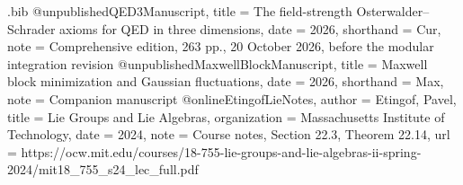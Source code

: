 \begin{filecontents*}[overwrite]{\jobname.bib}
@unpublished{QED3Manuscript,
  title = {The field-strength {Osterwalder--Schrader} axioms for {QED} in three dimensions},
  date = {2026},
  shorthand = {Cur},
  note = {Comprehensive edition, 263 pp., 20 October 2026, before the modular integration revision}
}
@unpublished{MaxwellBlockManuscript,
  title = {Maxwell block minimization and {Gaussian} fluctuations},
  date = {2026},
  shorthand = {Max},
  note = {Companion manuscript}
}
@online{EtingofLieNotes,
  author = {Etingof, Pavel},
  title = {Lie Groups and Lie Algebras},
  organization = {Massachusetts Institute of Technology},
  date = {2024},
  note = {Course notes, Section 22.3, Theorem 22.14},
  url = {https://ocw.mit.edu/courses/18-755-lie-groups-and-lie-algebras-ii-spring-2024/mit18_755_s24_lec_full.pdf}
}
\end{filecontents*}
\documentclass[11pt,letterpaper,reqno]{amsart}
\makeatletter
{}[2020/10/01]

\RequirePackage[T1]{fontenc}
\RequirePackage{lmodern}
\RequirePackage{microtype}
\RequirePackage[letterpaper,margin=1in,headheight=15pt]{geometry}
\RequirePackage{amsmath,amsthm,amssymb,mathtools}
\RequirePackage{enumitem}
\RequirePackage{perpage}
\RequirePackage{xcolor}
\RequirePackage[breaklinks=true,colorlinks=true,
  linkcolor=manuscriptred,citecolor=manuscriptcyan,urlcolor=manuscriptmagenta]{hyperref}
\RequirePackage{cleveref}

\setcounter{tocdepth}{1}
\renewcommand{\thefigure}{\Roman{figure}}
\renewcommand{\thetable}{\Roman{table}}
\renewcommand{\thefootnote}{%
  \ifnum\value{footnote}>9\arabic{footnote}\else\fnsymbol{footnote}\fi}

\theoremstyle{definition}
\newtheorem{ms@theorem}{Theorem}
\renewcommand{\thems@theorem}{\Alph{ms@theorem}}
\newtheorem*{ms@theoremstar}{Theorem}
\newtheorem{ms@proposition}{Proposition}[section]
\newtheorem{ms@lemma}[ms@proposition]{Lemma}
\newtheorem{ms@definition}[ms@proposition]{Definition}
\newtheorem{ms@corollary}[ms@proposition]{Corollary}
\newtheorem*{ms@corollarystar}{Corollary}

